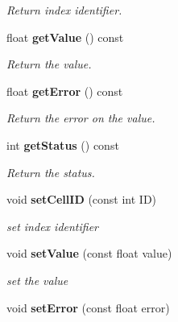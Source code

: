 \begin{DoxyCompactItemize}
\begin{DoxyCompactList}\small\item\em Return index identifier. \item\end{DoxyCompactList}\item 
float {\bf getValue} () const \label{classCALICE_1_1SimpleValue_a10ed251ac01eeb6b7c7c630eb419e86b}

\begin{DoxyCompactList}\small\item\em Return the value. \item\end{DoxyCompactList}\item 
float {\bf getError} () const \label{classCALICE_1_1SimpleValue_aac126ec03ca714db24176742edf86a5c}

\begin{DoxyCompactList}\small\item\em Return the error on the value. \item\end{DoxyCompactList}\item 
int {\bf getStatus} () const \label{classCALICE_1_1SimpleValue_a1690e6ce44ea335f86853bf3e9e2e252}

\begin{DoxyCompactList}\small\item\em Return the status. \item\end{DoxyCompactList}\item 
void {\bf setCellID} (const int ID)\label{classCALICE_1_1SimpleValue_a1d0bf64c141a1eab8230cff9bedad99a}

\begin{DoxyCompactList}\small\item\em set index identifier \item\end{DoxyCompactList}\item 
void {\bf setValue} (const float value)\label{classCALICE_1_1SimpleValue_a3cb312cbed5170e517a8cb6988720374}

\begin{DoxyCompactList}\small\item\em set the value \item\end{DoxyCompactList}\item 
void {\bf setError} (const float error)\label{classCALICE_1_1SimpleValue_a2ab0751649b263ce97ad6353c3a74b93}


\end{DoxyCompactItemize}
